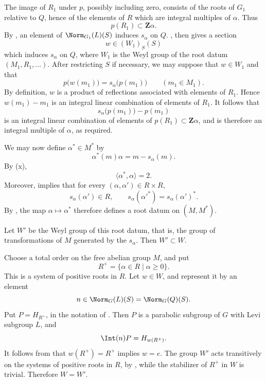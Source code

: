 The image of \(R_1\) under \(p\), possibly including zero, consists
of the roots of \(G_1\) relative to \(Q\), hence of the elements of
\(R\) which are integral multiples of \(\alpha\).  Thus
\[
 p(R_1)\subset\mathbf Z\alpha.
\]
By \textup{}, an element of \(\Norm_{G_1}(L)(S)\) induces
\(s_\alpha\) on \(Q\).  , then gives a section
\[
 w\in(W_1)_S(S)
\]
which induces \(s_\alpha\) on \(Q\), where \(W_1\) is the Weyl group
of the root datum \((M_1,R_1,\ldots)\).  After restricting \(S\) if
necessary, we may suppose that \(w\in W_1\) and that
\[
 p\bigl(w(m_1)\bigr)=s_\alpha\bigl(p(m_1)\bigr)
 \qquad(m_1\in M_1).
\]
By definition, \(w\) is a product of reflections associated with
elements of \(R_1\).  Hence \(w(m_1)-m_1\) is an integral linear
combination of elements of \(R_1\).  It follows that
\[
 s_\alpha\bigl(p(m_1)\bigr)-p(m_1)
\]
is an integral linear combination of elements of
\(p(R_1)\subset\mathbf Z\alpha\), and is therefore an integral
multiple of \(\alpha\), as required.


We may now define \(\alpha^*\in M^*\) by
\[
 \alpha^*(m)\alpha=m-s_\alpha(m).
\]
By \textup{(x)},
\[
 \langle\alpha^*,\alpha\rangle=2.
\]
Moreover, \textup{} implies that for every
\((\alpha,\alpha')\in R\times R\),
\[
 s_\alpha(\alpha')\in R,\qquad
 s_\alpha(\alpha'^*)=s_\alpha(\alpha')^*.
\]
By , the map
\(\alpha\mapsto\alpha^*\) therefore defines a root datum on
\((M,M^*)\).


Let \(W'\) be the Weyl group of this root datum, that is, the group
of transformations of \(M\) generated by the \(s_\alpha\).  Then
\(W'\subset W\).

Choose a total order on the free abelian group \(M\), and put
\[
 R^+=\{\alpha\in R\mid\alpha\geq0\}.
\]
This is a system of positive roots in \(R\).  Let \(w\in W\), and
represent it by an element
\[
 n\in\Norm_G(L)(S)=\Norm_G(Q)(S).
\]
Put \(P=H_{R^+}\), in the notation of .  Then \(P\) is a
parabolic subgroup of \(G\) with Levi subgroup \(L\), and
\[
 \Int(n)P=H_{w(R^+)}.
\]
It follows from  that \(w(R^+)=R^+\) implies \(w=e\).  The group
\(W'\) acts transitively on the systems of positive roots in \(R\),
by , while the stabilizer of \(R^+\) in \(W\) is
trivial.  Therefore \(W=W'\).

